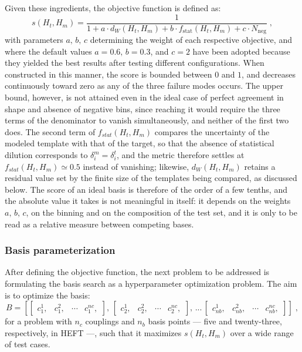 Given these ingredients, the objective function is defined as:
\begin{equation}
\label{eq:scorefunc}
    s(H_{t},H_{m})=\frac{1}{1+a\cdot d_W(H_{t},H_{m}) + b\cdot f_{\text{stat}}(H_{t},H_{m}) + c\cdot N_{\text{neg}}}\;,
\end{equation}
%
with parameters $a,\,b,\,c$ determining the weight of each respective objective, and where the default values $a=0.6,\,b=0.3$, and $c=2$ have been adopted because they yielded the best results after testing different configurations. When constructed in this manner, the score is bounded between $0$ and $1$, and decreases continuously toward zero as any of the three failure modes occurs. The upper bound, however, is not attained even in the ideal case of perfect agreement in shape and absence of negative bins, since reaching it would require the three terms of the denominator to vanish simultaneously, and neither of the first two does. The second term of $f_{stat}(H_{t},H_{m})$ compares the uncertainty of the modeled template with that of the target, so that the absence of statistical dilution corresponds to $\delta_i^{m}=\delta_i^{t}$, and the metric therefore settles at $f_{stat}(H_{t},H_{m})\simeq0.5$ instead of vanishing; likewise, $d_W(H_{t},H_{m})$ retains a residual value set by the finite size of the templates being compared, as discussed below. The score of an ideal basis is therefore of the order of a few tenths, and the absolute value it takes is not meaningful in itself: it depends on the weights $a,\,b,\,c$, on the binning and on the composition of the test set, and it is only to be read as a relative measure between competing bases.\medskip

\subsubsection{Basis parameterization}
%
After defining the objective function, the next problem to be addressed is formulating the basis search as a hyperparameter optimization problem. The aim is to optimize the basis:
%
\begin{equation}
 B=\left[ \begin{bmatrix}  c_1^{1},  & c_1^{2},  & \cdots & c_1^{nc}, \end{bmatrix},\, \begin{bmatrix}  c_2^{1},  & c_2^{2},  & \cdots & c_2^{nc},  \end{bmatrix},\, ...\, \begin{bmatrix}  c_{nb}^{1},  & c_{nb}^{2},  & \cdots & c_{nb}^{nc},  \end{bmatrix}\right]\;,
 \label{eq:basicbasis}
\end{equation}
%
for a problem with $n_c$ couplings and $n_b$ basis points — five and twenty-three, respectively, in HEFT —, such that it maximizes $s(H_t,H_m)$ over a wide range of test cases.

